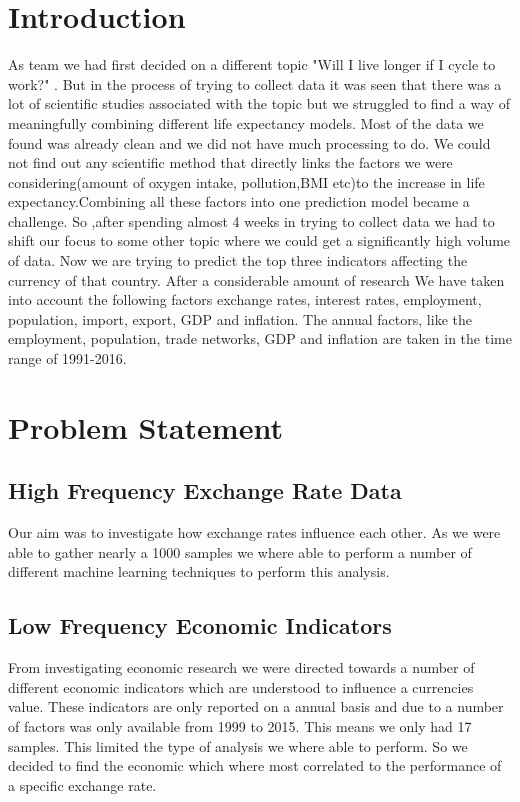 ﻿\section{Introduction}
As team we had first decided on a different topic "Will I live longer if I cycle to work?" . But in the process of trying to collect data it was seen that there was a lot of scientific studies associated with the topic but we struggled to find a way of meaningfully combining different life expectancy models.  Most of the data we found was already clean and we did not have much processing to do\cite{iacono2008access}. We could not find out any scientific method that directly links the factors we were considering(amount of oxygen intake, pollution,BMI etc)to the increase in life expectancy\cite{edwards2014spinning}.Combining all these factors into one prediction model became a challenge.
\newline
So ,after spending almost 4 weeks in trying to collect data we had to shift our focus to some other topic where we could get a significantly high volume of data.  Now we are trying to predict the top three indicators affecting the currency of that country.  After a considerable amount of research We have taken into account the following factors exchange rates, interest rates, employment, population, import, export, GDP and inflation\cite{kuruwitaarachchi2018design}.  The annual factors, like the employment, population, trade networks, GDP and inflation are taken in the time range of 1991-2016.

\section{Problem Statement}
\subsection{High Frequency Exchange Rate Data}
Our aim was to investigate how exchange rates influence each other.  As we were able to gather nearly a 1000 samples we where able to perform a number of different machine learning techniques to perform this analysis.

\subsection{Low Frequency Economic Indicators}
From investigating economic research we were directed towards a number of different economic indicators which are understood to influence a currencies value.  These indicators are only reported on a annual basis and due to a number of factors was only available from 1999 to 2015.  This means we only had 17 samples.  This limited the type of analysis we where able to perform. So we decided to find the economic which where most correlated to the performance of a specific exchange rate. 

